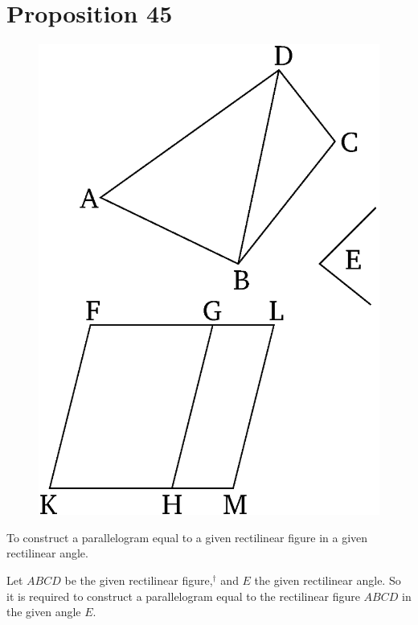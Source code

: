 \chapter*{Proposition 45}



\begin{figure}[ht]
    \begin{center}
    \includegraphics[width=0.5\linewidth]{figures/fig45e.eps}
    \label{fig:prop_45}
    \end{center}
\end{figure}

To construct a parallelogram equal to a given rectilinear figure in a given
rectilinear angle.

Let $ABCD$ be the given rectilinear figure,$^\dag$ and $E$ the given rectilinear angle.
So it is required to construct a parallelogram equal to the rectilinear figure
$ABCD$ in the given angle $E$.

